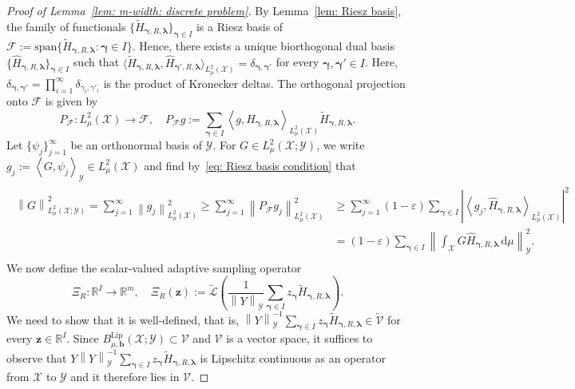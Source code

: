 \documentclass[namedate,webpdf]{ima-authoring-template-blank}
\newcommand*{\spn}{\mathrm{span}}
\newcommand*{\Lip}{\mathrm{Lip}}  %
\def\D{\,\mathrm{d}}
\newcommand*{\nm}[1]{{\left\|#1\right \|}}
\newcommand{\abs}[1]{\left|#1\right|}
\newcommand*{\ip}[2]{\left\langle #1, #2 \right\rangle}
\newcommand*{\ipd}[2]{\langle #1, #2 \rangle}    %
\numberwithin{counter}{section}
\numberwithin{equation}{section}
\theoremstyle{plain}
\theoremstyle{definition}
\newcommand*{\cF}{\mathcal{F}}
\newcommand*{\cL}{\mathcal{L}}
\newcommand*{\cV}{\mathcal{V}}
\newcommand*{\cX}{\mathcal{X}}
\newcommand*{\cY}{\mathcal{Y}}
\newcommand*{\bbR}{\mathbb{R}}
\newcommand*{\wtH}{\widetilde{H}}
\newcommand*{\whH}{\widehat{H}}
\theoremstyle{thmstyletwo}
\begin{document}
\begin{proof}[Proof of Lemma~\ref{lem: m-width: discrete problem}]
    By Lemma~\ref{lem: Riesz basis}, the family of functionals \(\{\wtH_{\bm{\gamma}, R, \bm{\lambda}}\}_{\bm{\gamma} \in I}\) is a Riesz basis of \(\cF := \spn\{\wtH_{\bm{\gamma}, R, \bm{\lambda}} : \bm{\gamma} \in I\}\). Hence, there exists a unique biorthogonal dual basis \(\{\whH_{\bm{\gamma}, R, \bm{\lambda}}\}_{\bm{\gamma} \in I}\) such that \(\ipd{\wtH_{\bm{\gamma}, R, \bm{\lambda}}}{\whH_{\bm{\gamma'}, R, \bm{\lambda}}}_{L^2_{\mu}(\cX)} = \delta_{\bm{\gamma}, \bm{\gamma'}}\) for every \(\bm{\gamma}, \bm{\gamma'} \in I\). Here, \( \delta_{\bm{\gamma}, \bm{\gamma'}} = \prod_{i = 1}^{\infty} \delta_{\gamma_i, \gamma'_i}\) is the product of Kronecker deltas. The orthogonal projection onto \(\cF\) is given by
    \[
    P_{\cF}: L_{\mu}^2(\cX) \to \cF, \quad 
    P_{\cF} g := \sum_{\bm{\gamma} \in I} \ip{g}{\whH_{\bm{\gamma}, R, \bm{\lambda}}}_{L_{\mu}^2(\cX)} \wtH_{\bm{\gamma}, R, \bm{\lambda}}.
    \]
    Let \(\{\psi_j\}_{j = 1}^{\infty}\) be an orthonormal basis of \(\cY\). For \(G \in L_{\mu}^2(\cX; \cY)\), we write \(g_j := \ip{G}{\psi_j}_{\cY} \in L_{\mu}^2(\cX)\) and find by~\eqref{eq: Riesz basis condition} that
    \begin{align}
    \begin{split}\label{eq: Riesz estimate}
        \nm{G}_{L_{\mu}^2(\cX; \cY)}^2 
        = \sum_{j = 1}^{\infty} \nm{g_j}_{L_{\mu}^2(\cX)}^2
        \geq \sum_{j = 1}^{\infty} \nm{P_{\cF} g_j}_{L_{\mu}^2(\cX)}^2 
        &\geq \sum_{j = 1}^{\infty} (1-\varepsilon) \sum_{\bm{\gamma} \in I} \abs{\ip{g_j}{\whH_{\bm{\gamma}, R, \bm{\lambda}}}_{L_{\mu}^2(\cX)}}^2 \\
        &= (1-\varepsilon) \sum_{\bm{\gamma} \in I} \nm{\int_{\cX} G \whH_{\bm{\gamma}, R, \bm{\lambda}} \D \mu}_{\cY}^2.
    \end{split}
    \end{align}
    We now define the scalar-valued adaptive sampling operator 
    \[
    \Xi_R: \bbR^I \to \bbR^m, \quad \Xi_R(\bm{z}) 
    := \widetilde{\cL}\left(\frac{1}{\nm{Y}_{\cY}} \sum_{\bm{\gamma} \in I} z_{\bm{\gamma}} \wtH_{\bm{\gamma}, R, \bm{\lambda}}\right).
    \]
    We need to show that it is well-defined, that is, \(\nm{Y}_{\cY}^{-1} \sum_{\bm{\gamma} \in I} z_{\bm{\gamma}} \wtH_{\bm{\gamma}, R, \bm{\lambda}} \in \widetilde{\cV}\) for every \(\bm{z} \in \bbR^I\). Since \(B_{\mu, \bm{b}}^{\Lip}(\cX; \cY) \subset \cV\) and \(\cV\) is a vector space, it suffices to observe that \(Y \nm{Y}_{\cY}^{-1} \sum_{\bm{\gamma} \in I} z_{\bm{\gamma}} \wtH_{\bm{\gamma}, R, \bm{\lambda}}\) is Lipschitz continuous as an operator from \(\cX\) to \(\cY\) and it therefore lies in \(\cV\).  

\end{proof}
\end{document}
